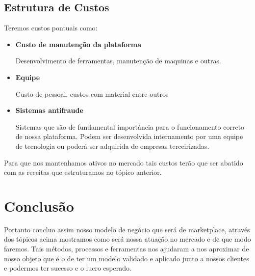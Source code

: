\documentclass[a4paper]{article}
\begin{document}
\subsection{Estrutura de Custos}
\par Teremos custos pontuais como:
\begin{itemize}
    \item \textbf{Custo de manutenção da plataforma}
    \par Desenvolvimento de ferramentas, manutenção de maquinas e outras.
    \item \textbf{Equipe} 
    \par Custo de pessoal, custos com material entre outros
    \item \textbf{Sistemas antifraude}
    \par Sistemas que são de fundamental importância para o funcionamento correto de nossa plataforma. Podem ser desenvolvida internamento por uma equipe de tecnologia ou poderá ser adquirida de empresas terceirizadas.
\end{itemize}
\par Para que nos mantenhamos ativos no mercado tais custos terão que ser abatido com as receitas que estruturamos no tópico anterior.
\vfill
\pagebreak
\section{Conclusão}
\par Portanto concluo assim nosso modelo de negócio que será de marketplace, através dos tópicos acima mostramos como será nossa atuação no mercado e de que modo faremos. Tais métodos, processos e ferramentas nos ajudaram a nos aproximar de nosso objeto que é o de ter um modelo validado e aplicado junto a nossos clientes e podermos ter sucesso e o lucro esperado.

\vfill
\pagebreak
\end{document}
